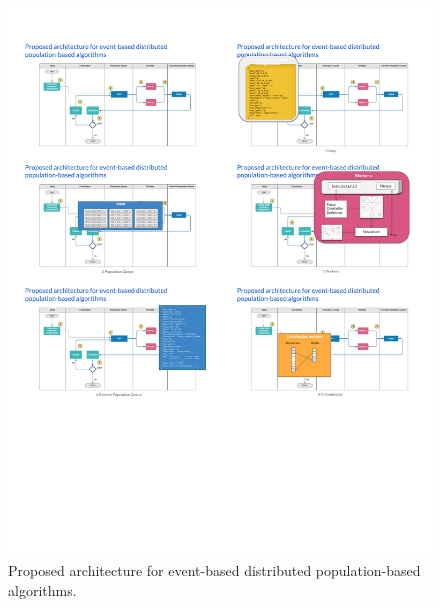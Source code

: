 \documentclass[runningheads]{llncs}
\begin{document}
\begin{figure}
  \centering
  \includegraphics[angle=0,width=1\textwidth]{Diagrams}
  \caption{Proposed architecture for event-based distributed population-based algorithms.}
  \label{fig:Diagrams} 
\end{figure}
\end{document}
